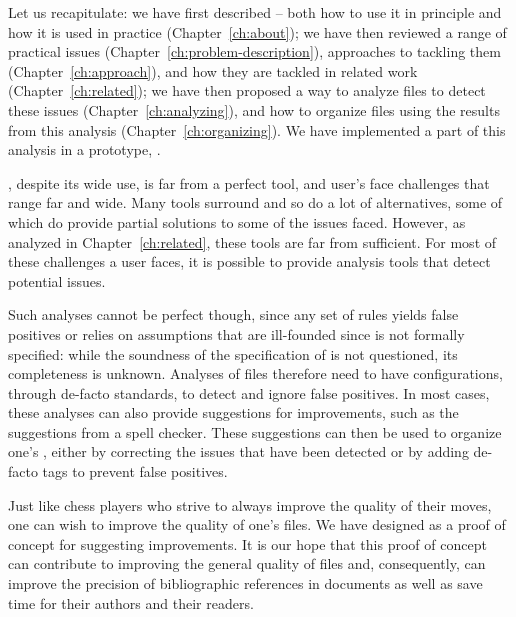 
{\noindent}
Let us recapitulate: we have first described {\bibtex} -- both how to
use it in principle and how it is used in practice
(Chapter~\ref{ch:about}); we have then reviewed a range of practical
issues (Chapter~\ref{ch:problem-description}), approaches to tackling
them (Chapter~\ref{ch:approach}), and how they are tackled in related
work (Chapter~\ref{ch:related}); we have then proposed a way to
analyze {\bibtex} files to detect these issues
(Chapter~\ref{ch:analyzing}), and how to organize {\bibtex} files
using the results from this analysis (Chapter~\ref{ch:organizing}).
We have implemented a part of this analysis in a prototype,
{\orangutan}.

{\bibtex}, despite its wide use, is far from a perfect tool, and
{\bibtex} user's face challenges that range far and wide.  Many tools
surround {\bibtex} and so do a lot of alternatives, some of which do
provide partial solutions to some of the issues faced.  However, as
analyzed in Chapter~\ref{ch:related}, these tools are far from
sufficient.  For most of these challenges a {\bibtex} user faces, it
is possible to provide analysis tools that detect potential issues.

Such analyses cannot be perfect though, since any set of rules yields
false positives or relies on assumptions that are ill-founded since
{\bibtex} is not formally specified: while the soundness of the
specification of {\bibtex} is not questioned, its completeness is
unknown.  Analyses of {\bibtex} files therefore need to have
configurations, through de-facto standards, to detect and ignore false
positives.  In most cases, these analyses can also provide suggestions
for improvements, such as the suggestions from a spell checker.  These
suggestions can then be used to organize one's , either by
correcting the issues that have been detected or by adding de-facto
tags to prevent false positives.

Just like chess players who strive to always improve the quality of
their moves, one can wish to improve the quality of one's {\bibtex}
files.  We have designed {\orangutan} as a proof of concept for
suggesting improvements.  It is our hope that this proof of concept
can contribute to improving the general quality of {\bibtex} files
and, consequently, can improve the precision of bibliographic
references in documents as well as save time for their authors and
their readers.